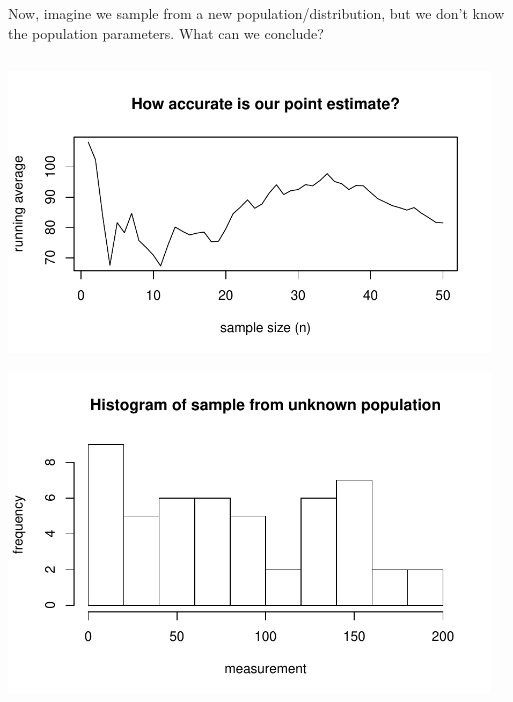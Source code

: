 \begin{frame}[fragile]
Now, imagine we sample from a new population/distribution, but we don't know the population parameters. What can we conclude?
\begin{columns}
\begin{column}{0.6\textwidth}
\vspace{-20pt}
\begin{center}
\includegraphics[width=\textwidth]{4-1_var_in_est/figures/running_mean_4sided_die/running_weight.pdf}
\end{center}
\vspace{-30pt}
\begin{center}
\includegraphics[width=\textwidth]{4-1_var_in_est/figures/running_mean_4sided_die/weight_hist.pdf}
\end{center}
\end{column}
\begin{column}{0.3\textwidth}
\pause
{}
\end{column}
\end{columns}
\end{frame}


